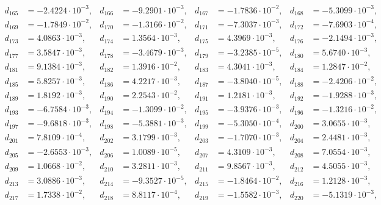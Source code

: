 \begin{align*}
d_{ 165 } &= -2.4224 \cdot 10^{ -3 }, & d_{ 166 } &= -9.2901 \cdot 10^{ -3 }, & d_{ 167 } &= -1.7836 \cdot 10^{ -2 }, & d_{ 168 } &= -5.3099 \cdot 10^{ -3 },\\ 
d_{ 169 } &= -1.7849 \cdot 10^{ -2 }, & d_{ 170 } &= -1.3166 \cdot 10^{ -2 }, & d_{ 171 } &= -7.3037 \cdot 10^{ -3 }, & d_{ 172 } &= -7.6903 \cdot 10^{ -4 },\\ 
d_{ 173 } &= 4.0863 \cdot 10^{ -3 }, & d_{ 174 } &= 1.3564 \cdot 10^{ -3 }, & d_{ 175 } &= 4.3969 \cdot 10^{ -3 }, & d_{ 176 } &= -2.1494 \cdot 10^{ -3 },\\ 
d_{ 177 } &= 3.5847 \cdot 10^{ -3 }, & d_{ 178 } &= -3.4679 \cdot 10^{ -3 }, & d_{ 179 } &= -3.2385 \cdot 10^{ -5 }, & d_{ 180 } &= 5.6740 \cdot 10^{ -3 },\\ 
d_{ 181 } &= 9.1384 \cdot 10^{ -3 }, & d_{ 182 } &= 1.3916 \cdot 10^{ -2 }, & d_{ 183 } &= 4.3041 \cdot 10^{ -3 }, & d_{ 184 } &= 1.2847 \cdot 10^{ -2 },\\ 
d_{ 185 } &= 5.8257 \cdot 10^{ -3 }, & d_{ 186 } &= 4.2217 \cdot 10^{ -3 }, & d_{ 187 } &= -3.8040 \cdot 10^{ -5 }, & d_{ 188 } &= -2.4206 \cdot 10^{ -2 },\\ 
d_{ 189 } &= 1.8192 \cdot 10^{ -3 }, & d_{ 190 } &= 2.2543 \cdot 10^{ -2 }, & d_{ 191 } &= 1.2181 \cdot 10^{ -3 }, & d_{ 192 } &= -1.9288 \cdot 10^{ -3 },\\ 
d_{ 193 } &= -6.7584 \cdot 10^{ -3 }, & d_{ 194 } &= -1.3099 \cdot 10^{ -2 }, & d_{ 195 } &= -3.9376 \cdot 10^{ -3 }, & d_{ 196 } &= -1.3216 \cdot 10^{ -2 },\\ 
d_{ 197 } &= -9.6818 \cdot 10^{ -3 }, & d_{ 198 } &= -5.3881 \cdot 10^{ -3 }, & d_{ 199 } &= -5.3050 \cdot 10^{ -4 }, & d_{ 200 } &= 3.0655 \cdot 10^{ -3 },\\ 
d_{ 201 } &= 7.8109 \cdot 10^{ -4 }, & d_{ 202 } &= 3.1799 \cdot 10^{ -3 }, & d_{ 203 } &= -1.7070 \cdot 10^{ -3 }, & d_{ 204 } &= 2.4481 \cdot 10^{ -3 },\\ 
d_{ 205 } &= -2.6553 \cdot 10^{ -3 }, & d_{ 206 } &= 1.0089 \cdot 10^{ -5 }, & d_{ 207 } &= 4.3109 \cdot 10^{ -3 }, & d_{ 208 } &= 7.0554 \cdot 10^{ -3 },\\ 
d_{ 209 } &= 1.0668 \cdot 10^{ -2 }, & d_{ 210 } &= 3.2811 \cdot 10^{ -3 }, & d_{ 211 } &= 9.8567 \cdot 10^{ -3 }, & d_{ 212 } &= 4.5055 \cdot 10^{ -3 },\\ 
d_{ 213 } &= 3.0886 \cdot 10^{ -3 }, & d_{ 214 } &= -9.3527 \cdot 10^{ -5 }, & d_{ 215 } &= -1.8464 \cdot 10^{ -2 }, & d_{ 216 } &= 1.2128 \cdot 10^{ -3 },\\ 
d_{ 217 } &= 1.7338 \cdot 10^{ -2 }, & d_{ 218 } &= 8.8117 \cdot 10^{ -4 }, & d_{ 219 } &= -1.5582 \cdot 10^{ -3 }, & d_{ 220 } &= -5.1319 \cdot 10^{ -3 },\\ 

\end{align*}
